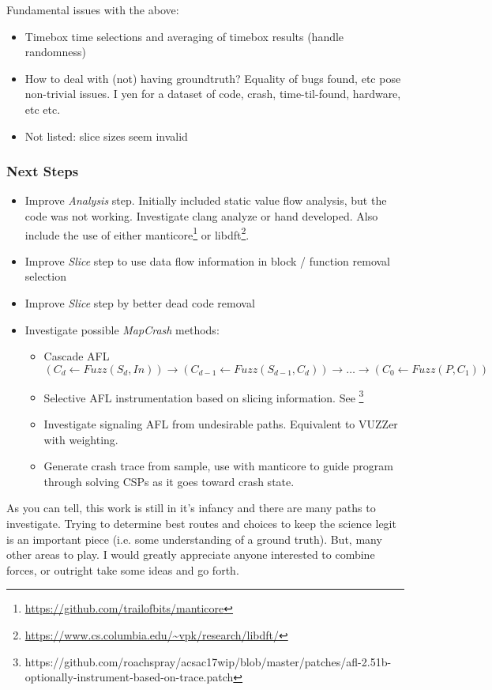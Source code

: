 \documentclass{beamer}
\begin{document}
{	Fundamental issues with the above:	
	\begin{itemize}
	\item Timebox time selections and averaging of timebox results (handle randomness)
	\item How to deal with (not) having groundtruth? Equality of bugs found, etc pose non-trivial issues. I yen for a
	dataset of code, crash, time-til-found, hardware, etc etc.
	\item Not listed: slice sizes seem invalid
	\end{itemize}
	
}



\frame
{
	\frametitle{Next Steps}
	\tiny
	\begin{itemize}
	\item Improve \emph{Analysis} step. Initially included static value flow analysis, but the code was not working. Investigate clang analyze or hand developed. Also include the use of either manticore\footnote{\url{https://github.com/trailofbits/manticore}} or libdft\footnote{\url{https://www.cs.columbia.edu/~vpk/research/libdft/}}.


	\item Improve \emph{Slice} step to use data flow information in block / function removal selection
	\item Improve \emph{Slice} step by better dead code removal

	\item Investigate  possible \emph{MapCrash} methods:
	\begin{itemize}
	\tiny
	\item Cascade AFL 
\[
(C_d \leftarrow Fuzz(S_d, In)) \rightarrow (C_{d-1} \leftarrow Fuzz(S_{d-1}, C_d)) \rightarrow \ldots \rightarrow (C_0 \leftarrow Fuzz(P, C_1))
\]
	
	\item Selective AFL instrumentation based on slicing information. See \footnote{https://github.com/roachspray/acsac17wip/blob/master/patches/afl-2.51b-optionally-instrument-based-on-trace.patch}
	\item Investigate signaling AFL from undesirable paths. Equivalent to VUZZer with  weighting.
	\item Generate crash trace from sample, use with manticore to guide program through solving CSPs as it goes toward crash state.
	\end{itemize}
	\end{itemize}
	As you can tell, this work is still in it's infancy and there are many paths to investigate. Trying to determine best routes and
	choices to keep the science legit is an important piece (i.e. some understanding of a ground truth). But, many other areas to play.
	I would greatly appreciate anyone interested to combine forces, or outright take some ideas and go forth.
	
}
\end{document}
